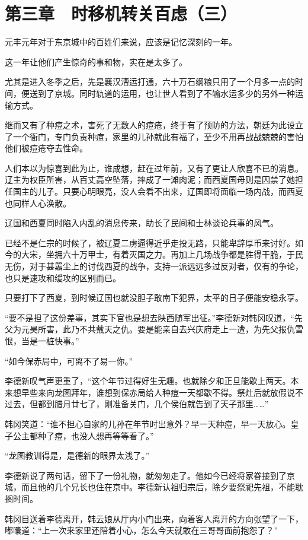 \section{第三章　时移机转关百虑（三）}

元丰元年对于东京城中的百姓们来说，应该是记忆深刻的一年。

这一年让他们产生惊奇的事和物，实在是太多了。

尤其是进入冬季之后，先是襄汉漕运打通，六十万石纲粮只用了一个月多一点的时间，便送到了京城。同时轨道的运用，也让世人看到了不输水运多少的另外一种运输方式。

继而又有了种痘之术，害死了无数人的痘疮，终于有了预防的方法，朝廷为此设立了一个衙门，专门负责种痘，家里的儿孙就此有福了，至少不用再战战兢兢的害怕他们被痘疮夺去性命。

人们本以为惊喜到此为止，谁成想，赶在过年前，又有了更让人欣喜不已的消息。辽主为权臣所害，从百丈高空坠落，摔成了一滩肉泥；而西夏国母则是囚禁了她担任国主的儿子。只要心明眼亮，没人会看不出来，辽国即将面临一场内战，而西夏也同样人心涣散。

辽国和西夏同时陷入内乱的消息传来，助长了民间和士林谈论兵事的风气。

已经不是仁宗的时候了，被辽夏二虏逼得近乎走投无路，只能卑辞厚币来讨好。如今的大宋，坐拥六十万甲士，有着灭国之力。再加上几场战争都是胜得干脆，于民无伤，对于甚嚣尘上的讨伐西夏的战争，支持一派远远多过反对者，仅有的争论，也只是速攻和缓攻的区别而已。

只要打下了西夏，到时候辽国也就没胆子敢南下犯界，太平的日子便能安稳永享。

“要不是担了这份差事，其实下官也是想去陕西随军出征。”李德新对韩冈叹道，“先父为元昊所害，此乃不共戴天之仇。要是能亲自去兴庆府走上一遭，为先父报仇雪恨，当是一桩快事。”

“如今保赤局中，可离不了易一你。”

李德新叹气声更重了，“这个年节过得好生无趣。也就除夕和正旦能歇上两天。本来想早些来向龙图拜年，谁想到保赤局给人种痘一天都歇不得。祭灶后就放假说不过去，但都到腊月廿七了，刚准备关门，几个侯伯就告到了天子那里……”

韩冈笑道：“谁不担心自家的儿孙在年节时出意外？早一天种痘，早一天放心。皇子公主都种了痘，也没人想再等等看了。”

“龙图教训得是，是德新的眼界太浅了。”

李德新说了两句话，留下了一份礼物，就匆匆走了。他如今已经将家眷接到了京城，而且他的几个兄长也住在京中。李德新认祖归宗后，除夕要祭祀先祖，不能耽搁时间。

韩冈目送着李德离开，韩云娘从厅内小门出来，向着客人离开的方向张望了一下，嘟囔道：“上一次来家里还陪着小心，怎么今天就敢在三哥哥面前抱怨了？”

